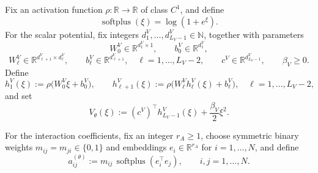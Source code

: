\documentclass[hidelinks,review,nohypdvips,onefignum,onetabnum]{siamart220329}
\newcommand{\N}{\mathbb{N}}
\newcommand{\R}{\mathbb{R}}
\newcommand{\softplus}{\operatorname{softplus}}
\begin{document}
\begin{definition}\label{def:neural-param}
Fix an activation function \(\rho:\R\to \R\) of class \(C^1\), and define
\begin{equation}\label{eq:softplus}
\softplus(\xi)=\log(1+e^{\xi}).
\end{equation}
For the scalar potential, fix integers \(d_1^V,\dots,d_{L_V-1}^V\in \N\), together with parameters
\begin{equation}\label{eq:V-params}
W_0^V\in \R^{d_1^V\times 1}, \qquad b_0^V\in \R^{d_1^V},
\end{equation}
\begin{equation*}
W_{\ell}^V\in \R^{d_{\ell+1}^V\times d_{\ell}^V}, \qquad b_{\ell}^V\in \R^{d_{\ell+1}^V}, \quad \ell=1,\dots,L_V-2,
\qquad c^V\in \R^{d_{L_V-1}^V}, \qquad \beta_V\ge 0.
\end{equation*}
Define
\begin{equation}\label{eq:V-hidden}
h_1^V(\xi):=\rho\bigl(W_0^V\xi+b_0^V\bigr), \qquad
h_{\ell+1}^V(\xi):=\rho\bigl(W_{\ell}^V h_{\ell}^V(\xi)+b_{\ell}^V\bigr), \quad \ell=1,\dots,L_V-2,
\end{equation}
and set
\begin{equation}\label{eq:V-mlp}
V_{\theta}(\xi):=(c^V)^\top h_{L_V-1}^V(\xi)+\frac{\beta_V}{2}\xi^2.
\end{equation}

For the interaction coefficients, fix an integer \(r_A\ge 1\), choose symmetric binary weights
\(m_{ij}=m_{ji}\in \{0,1\}\) and embeddings \(e_i\in \R^{r_A}\) for \(i=1,\dots,N\), and define
\begin{equation}\label{eq:A-param}
a_{ij}^{(\theta)}:=m_{ij}\,\softplus(e_i^\top e_j), \qquad i,j=1,\dots,N.
\end{equation}


\end{definition}
\end{document}
